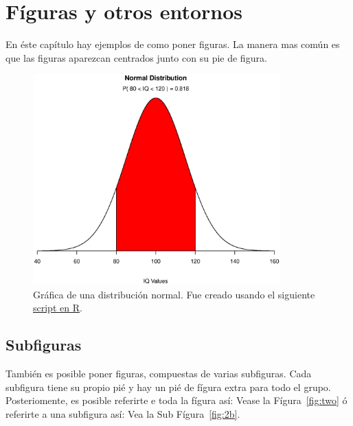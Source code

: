 \chapter{Fíguras y otros entornos}
\label{chap:figuras}
En éste capítulo hay ejemplos de como poner figuras.
La manera mas común es que las figuras aparezcan centrados junto con su pie de figura.
 
\begin{figure}[htb]
  \centering
  \label{fig:normalDist}
  \includegraphics[width=0.85\textwidth]{img/cap02/normal}
  \caption[Distribución normal]{Gráfica de una distribución normal. Fue creado usando el siguiente \href{https://www.statmethods.net/advgraphs/probability.html}{script en R}.}
\end{figure}

\section{Subfiguras}

También es posible poner figuras, compuestas de varias subfiguras.
Cada subfigura tiene su propio pié y hay un pié de fígura extra para todo el grupo.
Posteriomente, es posible referirte e toda la fígura así: Vease la  Fígura~\ref{fig:two} ó referirte a una subfigura así:
Vea la Sub Fígura~\ref{fig:2b}.

